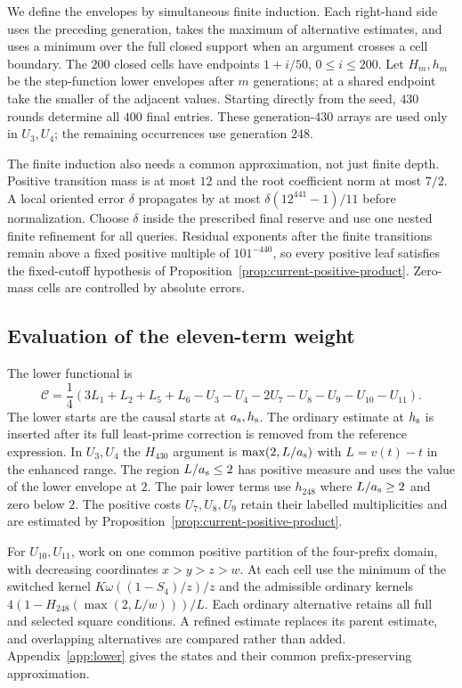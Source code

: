 We define the envelopes by simultaneous finite induction. Each
right-hand side uses the preceding generation, takes the maximum of
alternative estimates, and uses a minimum over the full closed support
when an argument crosses a cell boundary. The $200$ closed cells have
endpoints $1+i/50$, $0\le i\le200$. Let $H_m,h_m$ be the step-function
lower envelopes after $m$ generations; at a shared endpoint take the
smaller of the adjacent values. Starting directly from the seed,
$430$ rounds determine all $400$ final entries. These
generation-$430$ arrays are used only in $U_3,U_4$; the remaining
occurrences use generation $248$.

The finite induction also needs a common approximation, not just
finite depth.  Positive transition mass is at most $12$ and the
root coefficient norm at most $7/2$.  A local oriented error
$\delta$ propagates by at most
$\delta(12^{441}-1)/11$ before normalization.  Choose
$\delta$ inside the prescribed final reserve and use one nested
finite refinement for all queries.  Residual exponents after the
finite transitions remain above a fixed positive multiple of
$101^{-440}$, so every positive leaf satisfies the fixed-cutoff
hypothesis of Proposition~\ref{prop:current-positive-product}.
Zero-mass cells are controlled by absolute errors.

\subsection{Evaluation of the eleven-term weight}

The lower functional is
\begin{equation}
 \mathcal C=\frac14
   (3L_1+L_2+L_5+L_6-U_3-U_4-2U_7-U_8-U_9-U_{10}-U_{11}).
 \label{eq:current-root-functional}
\end{equation}
The lower starts are the causal starts at ${a_{\rm s}},{h_{\rm s}}$. The ordinary estimate
at ${h_{\rm s}}$ is inserted after its full least-prime correction is removed
from the reference expression. In $U_3,U_4$ the
$H_{430}$ argument is $\max(2,L/{a_{\rm s}})$ with $L=v(t)-t$ in the enhanced
range. The region $L/{a_{\rm s}}\le2$ has positive measure and uses the value
of the lower envelope at $2$.
The pair lower terms use $h_{248}$ where $L/{a_{\rm s}}\ge2$ and zero below
$2$.  The positive costs $U_7,U_8,U_9$ retain their labelled
multiplicities and are estimated by
Proposition~\ref{prop:current-positive-product}.

For $U_{10},U_{11}$, work on one common positive partition of the
four-prefix domain, with decreasing coordinates $x>y>z>w$.
At each cell use the minimum of the switched kernel
$K\omega((1-S_4)/z)/z$ and the admissible ordinary kernels
$4(1-H_{248}(\max(2,L/w)))/L$. Each ordinary alternative retains
all full and selected square conditions. A refined estimate replaces
its parent estimate, and overlapping alternatives are compared rather
than added. Appendix~\ref{app:lower} gives the states and their common
prefix-preserving approximation.

